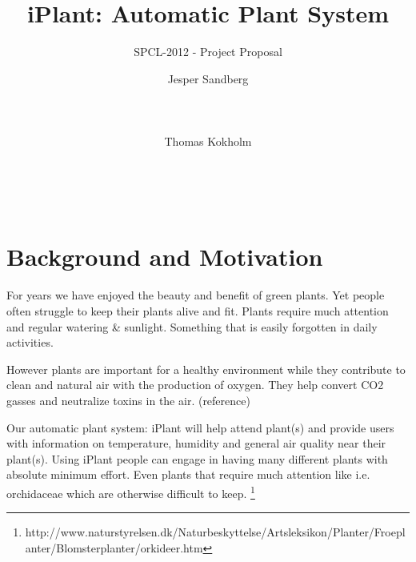 \documentclass{ubicomp2012}
\begin{document}
\setlength{\paperheight}{11in}
\setlength{\paperwidth}{8.5in}
\setlength{\pdfpageheight}{\paperheight}
\setlength{\pdfpagewidth}{\paperwidth}




\title{iPlant: Automatic Plant System}
\subtitle{SPCL-2012 - Project Proposal}
\author{
  \alignauthor Jesper Sandberg\\
    \\
    \\
    \\
 \alignauthor Thomas Kokholm\\
    \\
    \\
    \\
      }
\maketitle

\section{Background and Motivation}
For years we have enjoyed the beauty and benefit of green plants. Yet people often struggle to keep their plants alive and fit. Plants require much attention and regular watering \& sunlight. Something that is easily forgotten in daily activities.



However plants are important for a healthy environment while they contribute to clean and natural air with the production of oxygen.
They help convert CO2 gasses and neutralize toxins in the air. (reference)

Our automatic plant system: iPlant will help attend plant(s) and provide users with information on temperature, humidity and general air quality near their plant(s). Using iPlant people can engage in having many different plants with absolute minimum effort. Even plants that require much attention like i.e. orchidaceae which are otherwise difficult to keep. \footnote{http://www.naturstyrelsen.dk/Naturbeskyttelse/Artsleksikon/Planter/Froeplanter/Blomsterplanter/orkideer.htm}
\end{document}
